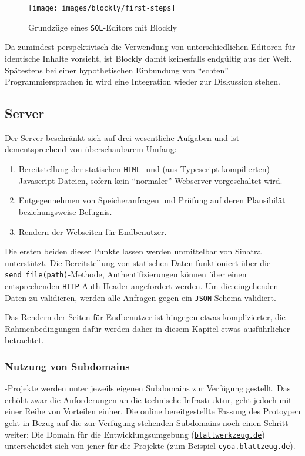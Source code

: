 \begin{figure}[t]
  \centering \texttt{[image: images/blockly/first-steps]}
  \caption{Grundzüge eines \texttt{SQL}-Editors mit Blockly}
  \label{fig:blockly-eval-sql}
\end{figure}

Da \idename{} zumindest perspektivisch die Verwendung von unterschiedlichen Editoren für identische Inhalte vorsieht, ist Blockly damit keinesfalls endgültig aus der Welt. Spätestens bei einer hypothetischen Einbundung von "`echten"' Programmiersprachen in \idename{} wird eine Integration wieder zur Diskussion stehen.

\subsection{Server}

Der Server beschränkt sich auf drei wesentliche Aufgaben und ist dementsprechend von überschaubarem Umfang:

\begin{enumerate}[noitemsep]
\item Bereitstellung der statischen \texttt{HTML}- und (aus Typescript kompilierten) Javascript-Dateien, sofern kein "`normaler"' Webserver vorgeschaltet wird.
\item Entgegennehmen von Speicheranfragen und Prüfung auf deren Plausibilät beziehungsweise Befugnis.
\item Rendern der Webseiten für Endbenutzer.
\end{enumerate}

Die ersten beiden dieser Punkte lassen werden unmittelbar von Sinatra unterstützt. Die Bereitstellung von statischen Daten funktioniert über die \texttt{send\_file(path)}-Methode, Authentifizierungen können über einen entsprechenden \texttt{HTTP}-Auth-Header angefordert werden. Um die eingehenden Daten zu validieren, werden alle Anfragen gegen ein \texttt{JSON}-Schema validiert.

Das Rendern der Seiten für Endbenutzer ist hingegen etwas komplizierter, die Rahmenbedingungen dafür werden daher in diesem Kapitel etwas ausführlicher betrachtet.

\subsubsection{Nutzung von Subdomains}

\idename{}-Projekte werden unter jeweils eigenen Subdomains zur Verfügung gestellt. Das erhöht zwar die Anforderungen an die technische Infrastruktur, geht jedoch mit einer Reihe von Vorteilen einher. Die online bereitgestellte Fassung des Protoypen geht in Bezug auf die zur Verfügung stehenden Subdomains noch einen Schritt weiter: Die Domain für die Entwicklungsumgebung (\href{http://blattwerkzeug.de}{\texttt{blattwerkzeug.de}}) unterscheidet sich von jener für die Projekte (zum Beispiel \href{http://cyoa.blattzeug.de}{\texttt{cyoa.blattzeug.de}}).


